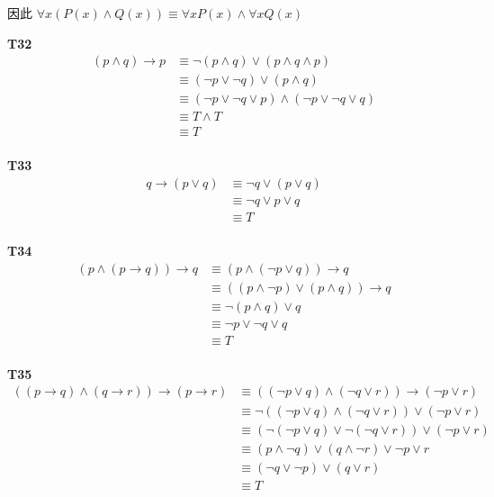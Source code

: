 \documentclass{article}
\begin{document}
因此 $\forall x(P(x) \land Q(x)) \equiv \forall x P(x) \land \forall x  Q(x)$

\vspace{10pt}

\textbf{T32}
\begin{align*}
    (p \land q) \rightarrow p &\equiv \lnot(p \land q) \lor (p \land q \land p)\\
    &\equiv (\lnot p \lor \lnot q) \lor (p \land q)\\
    &\equiv (\lnot p \lor \lnot q \lor p) \land (\lnot p \lor \lnot q \lor q)\\
    &\equiv T \land T\\
    &\equiv T\\
\end{align*}

\vspace{10pt}

\textbf{T33}
\begin{align*}
    q \rightarrow (p \lor q) &\equiv \lnot q \lor (p \lor q)\\
    &\equiv \lnot q \lor p \lor q\\
    &\equiv T\\
\end{align*}

\vspace{10pt}

\textbf{T34}
\begin{align*}
    (p \land (p \rightarrow q)) \rightarrow q &\equiv (p \land (\lnot p \lor q)) \rightarrow q\\
    &\equiv ((p \land \lnot p) \lor (p \land q)) \rightarrow q\\
    &\equiv \lnot(p \land q) \lor q\\
    &\equiv \lnot p \lor \lnot q \lor q\\
    &\equiv T\\
\end{align*}

\vspace{10pt}

\textbf{T35}
\begin{align*}
    ((p \rightarrow q) \land (q \rightarrow r)) \rightarrow (p \rightarrow r) &\equiv ((\lnot p \lor q) \land (\lnot q \lor r)) \rightarrow (\lnot p \lor r)\\
    &\equiv \lnot ((\lnot p \lor q) \land (\lnot q \lor r)) \lor (\lnot p \lor r)\\
    &\equiv (\lnot (\lnot p \lor q) \lor \lnot (\lnot q \lor r)) \lor (\lnot p \lor r)\\
    &\equiv (p \land \lnot q) \lor (q \land \lnot r) \lor \lnot p \lor r\\
    &\equiv (\lnot q \lor \lnot p) \lor (q \lor r)\\
    &\equiv T\\
\end{align*}
\end{document}
